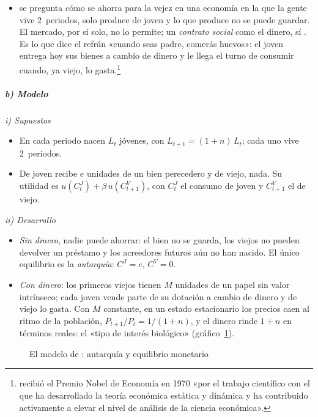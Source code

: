 \documentclass[11pt]{article}
\begin{document}
\begin{itemize}
\item \textcite{Samuelson1958Exact} se pregunta cómo se ahorra para la vejez en una economía en la que la gente vive 2~periodos, solo produce de joven y lo que produce no se puede guardar. El mercado, por sí solo, no lo permite; un \emph{contrato social} como el dinero, sí . Es lo que dice el refrán «cuando seas padre, comerás huevos»: el joven entrega hoy sus bienes a cambio de dinero y le llega el turno de consumir cuando, ya viejo, lo gasta.\footnote{ recibió el Premio Nobel de Economía en 1970 «por el trabajo científico con el que ha desarrollado la teoría económica estática y dinámica y ha contribuido activamente a elevar el nivel de análisis de la ciencia económica»\nocite{Nobel1970Samuelson}.}
\end{itemize}

\subparagraph{b) Modelo}

\hspace*{3.6em}\emph{i) Supuestos}

\begin{itemize}
\item En cada periodo nacen $L_t$ jóvenes, con $L_{t+1}=(1+n)\,L_t$; cada uno vive 2~periodos.
\item De joven recibe $e$ unidades de un bien perecedero y de viejo, nada. Su utilidad es $u(C^J_t)+\beta\,u(C^V_{t+1})$, con $C^J_t$ el consumo de joven y $C^V_{t+1}$ el de viejo.
\end{itemize}

\hspace*{3.6em}\emph{ii) Desarrollo}

\begin{itemize}
\item \emph{Sin dinero}, nadie puede ahorrar: el bien no se guarda, los viejos no pueden devolver un préstamo y los acreedores futuros aún no han nacido. El único equilibrio es la \emph{autarquía}: $C^J=e$, $C^V=0$.
\item \emph{Con dinero}: los primeros viejos tienen $M$ unidades de un papel sin valor intrínseco; cada joven vende parte de su dotación a cambio de dinero y de viejo lo gasta. Con $M$ constante, en un estado estacionario los precios caen al ritmo de la población, $P_{t+1}/P_t=1/(1+n)$, y el dinero rinde $1+n$ en términos reales: el «tipo de interés biológico» (gráfico~\ref{fig:samuelson}).
\end{itemize}

\begin{figure}[H]
\centering
\caption{El modelo de : autarquía y equilibrio monetario}\label{fig:samuelson}
\end{figure}
\end{document}
